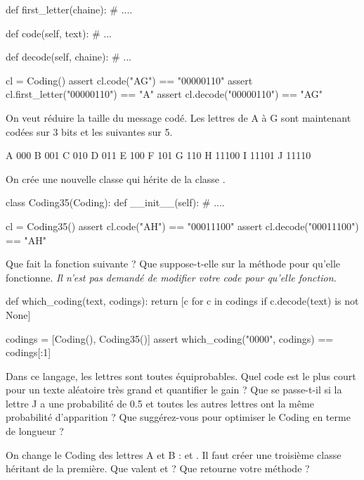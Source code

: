 \begin{xexercice}
\begin{verbatimx}
    def first_letter(chaine):
        # ....

    def code(self, text):
        # ...

    def decode(self, chaine):
        # ...

cl = Coding()
assert cl.code("AG") == "00000110"
assert cl.first_letter("00000110") == "A"
assert cl.decode("00000110") == "AG"
\end{verbatimx}

\exequest On veut réduire la taille du message codé.
Les lettres de A à G sont maintenant codées sur 3 bits et les suivantes sur 5.

\begin{verbatimx}
A 000
B 001
C 010
D 011
E 100
F 101
G 110
H 11100
I 11101
J 11110
\end{verbatimx}

On crée une nouvelle classe  qui hérite de la classe .

\begin{verbatimx}
class Coding35(Coding):
    def __init__(self):
        # ....

cl = Coding35()
assert cl.code("AH") == "00011100"
assert cl.decode("00011100") == "AH"
\end{verbatimx}

\exequest Que fait la fonction suivante ? Que suppose-t-elle sur la méthode  pour qu'elle fonctionne.
\textit{Il n'est pas demandé de modifier votre code pour qu'elle fonction.}

\begin{verbatimx}
def which_coding(text, codings):
    return [c for c in codings if c.decode(text) is not None]

codings = [Coding(), Coding35()]
assert which_coding("0000", codings) == codings[:1]
\end{verbatimx}

\exequest Dans ce langage, les lettres sont toutes équiprobables.
Quel code est le plus court pour un texte aléatoire très grand et quantifier le gain ?
Que se passe-t-il si la lettre J a une probabilité de 0.5 et toutes les autres lettres ont la même probabilité
d'apparition ? Que suggérez-vous pour optimiser le Coding en terme de longueur ?

\exequest On change le Coding des lettres A et B :  et . Il faut créer une troisième classe
héritant de la première. Que valent  et  ?
Que retourne votre méthode  ?


\end{xexercice}
